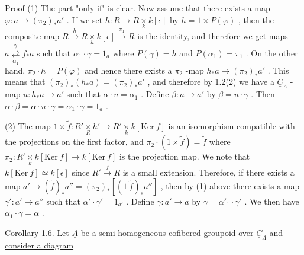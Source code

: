 \underline{Proof}  (1) The part  "only if"  is clear. Now assume that there exists a map $\varphi : a \longrightarrow (\pi_2)_* a'$  . If we set  $h : R \longrightarrow R \underset{k}{\times} k[\epsilon]$  by  $h = 1 \times P(\varphi)$  , then the composite map  $R \xrightarrow{\ h\ } R \underset{h}{\times} k[\epsilon] \xrightarrow{\ \pi_1\ } R$  is the identity, and therefore we get maps  $a \overset{\gamma}{\underset{\alpha_1}{\rightleftarrows}} f_* a$  such that  $\alpha_1 \cdot \gamma = 1_a$  where  $P(\gamma) = h$  and  $P(\alpha_1) = \pi_1$  . On the other hand,  $\pi_2 \cdot h = P(\varphi)$  and hence there exists a  $\pi_2$ -map $h_* a \longrightarrow (\pi_2)_* a'$  . This means that  $(\pi_2)_*(h_* a) = (\pi_2)_* a'$  , and therefore by 1.2(2) we have a  $\underline{C}_{\Lambda}$ -map  $u : h_* a \longrightarrow a'$  such that  $\alpha \cdot u = \alpha_1$  . Define $\beta : a \longrightarrow a'$  by  $\beta = u \cdot \gamma$  . Then  $\alpha \cdot \beta = \alpha \cdot u \cdot \gamma = \alpha_1 \cdot \gamma = 1_a$  .

(2) The map  $1 \times \tilde{f} : R' \underset{R}{\times} h' \longrightarrow R' \underset{k}{\times} k[\mathrm{Ker}\ f]$  is an isomorphism compatible with the projections on the first factor, and  $\pi_2 \cdot (1 \times \tilde{f}) = \tilde{f}$  where $\pi_2 : R' \underset{k}{\times} k[\mathrm{Ker}\ f] \longrightarrow k[\mathrm{Ker}\ f]$  is the projection map. We note that $k[\mathrm{Ker}\ f] \simeq k[\epsilon]$  since  $R' \xrightarrow{\ f\ } R$  is a small extension. Therefore, if there exists a map  $a' \longrightarrow (\tilde{f})_* a'' = (\pi_2)_* [(1\ \tilde{f})_* a'']$  , then by (1) above there exists a map  $\gamma': a' \longrightarrow a''$  such that  $\alpha' \cdot \gamma' = 1_{a'}$  . Define  $\gamma : a' \longrightarrow a$ by  $\gamma = \alpha'_1 \cdot \gamma'$  . We then have  $\alpha_1 \cdot \gamma = \alpha$  .



\underline{Corollary} 1.6.   \underline{Let}  $\underline{A}$  \underline{be a semi-homogeneous cofibered groupoid over}  $\underline{C}_{\Lambda}$ \underline{and consider a diagram}

